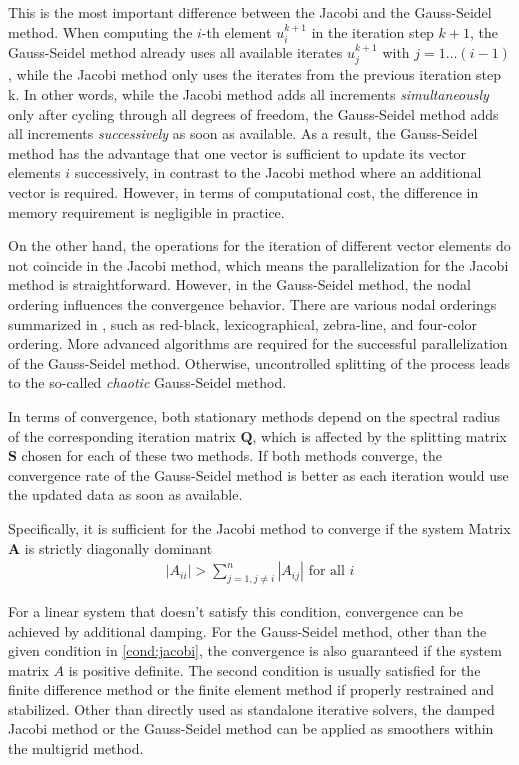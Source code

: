 This is the most important difference between the Jacobi and the Gauss-Seidel method. When computing the $i$-th element $u_i^{k+1}$ in the iteration step $k+1$, the Gauss-Seidel method already uses all available iterates $u_j^{k+1}$ with $j=1\dots(i-1)$, while the Jacobi method only uses the iterates from the previous iteration step k. In other words, while the Jacobi method adds all increments \textit{simultaneously} only after cycling through all degrees of freedom, the Gauss-Seidel method adds all increments \textit{successively} as soon as available. As a result, the Gauss-Seidel method has the advantage that one vector is sufficient to update its vector elements $i$ successively, in contrast to the Jacobi method where an additional vector is required. However, in terms of computational cost, the difference in memory requirement is negligible in practice. 

On the other hand, the operations for the iteration of different vector elements do not coincide in the Jacobi method, which means the parallelization for the Jacobi method is straightforward. However, in the Gauss-Seidel method, the nodal ordering influences the convergence behavior. There are various nodal orderings summarized in \citep{hackbusch2013multi}, such as red-black, lexicographical, zebra-line, and four-color ordering. More advanced algorithms are required for the successful parallelization of the Gauss-Seidel method. Otherwise, uncontrolled splitting of the process leads to the so-called \textit{chaotic} Gauss-Seidel method.  

In terms of convergence, both stationary methods depend on the spectral radius of the corresponding iteration matrix $\boldsymbol{Q}$, which is affected by the splitting matrix $\boldsymbol{S}$ chosen for each of these two methods. If both methods converge, the convergence rate of the Gauss-Seidel method is better as each iteration would use the updated data as soon as available. 

Specifically, it is sufficient for the Jacobi method to converge if the system Matrix $\boldsymbol{A}$ is strictly diagonally dominant 
\citep{https://doi.org/10.1002/zamm.19940740205}
\begin{align}
    |A_{ii}| > \sum_{j=1,j\neq i}^{n}|A_{ij}| \text{ for all }i
    \label{cond:jacobi}
\end{align}

For a linear system that doesn't satisfy this condition, convergence can be achieved by additional damping. For the Gauss-Seidel method, other than the given condition in \autoref{cond:jacobi}, the convergence is also guaranteed if the system matrix $A$ is positive definite. The second condition is usually satisfied for the finite difference method or the finite element method if properly restrained and stabilized. \citep{bathe2006finite} Other than directly used as standalone iterative solvers, the damped Jacobi method or the Gauss-Seidel method can be applied as smoothers within the multigrid method.

